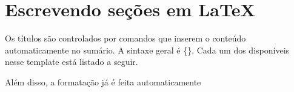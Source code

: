 \section[Escrevendo seções ...]{Escrevendo seções em \LaTeX}

Os títulos são controlados por comandos que inserem o conteúdo automaticamente no sumário. A sintaxe geral é \string{}\{<título mostrado>\}. Cada um dos disponíveis nesse template está listado a seguir.

\begin{itemize}
    \item \string\chapter
    \item \string\section
    \item \string\subsection
    \item \string\subsubsection
    \item \string\paragraph
\end{itemize}

Além disso, a formatação já é feita automaticamente
